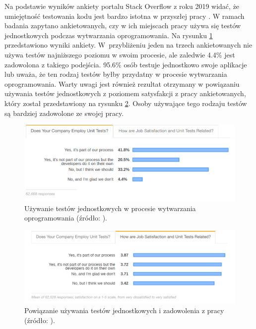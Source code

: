 Na podstawie wyników ankiety portalu Stack Overflow z roku 2019 widać, że umiejętność testowania kodu jest bardzo istotna w przyszłej pracy \cite{stack-overflow-survey}.
W ramach badania zapytano ankietowanych, czy w ich miejscach pracy używa się testów jednostkowych podczas wytwarzania oprogramowania.
Na rysunku \ref{fig:unit-tests-use} przedstawiono wyniki ankiety.
W~przybliżeniu jeden na trzech ankietowanych nie używa testów najniższego poziomu w swoim procesie, ale zaledwie 4.4\% jest zadowolona z takiego podejścia.
95.6\% osób testuje jednostkowo swoje aplikacje lub uważa, że ten rodzaj testów byłby przydatny w procesie wytwarzania oprogramowania.
Warty uwagi jest również rezultat otrzymany w powiązaniu używania testów jednostkowych z poziomem satysfakcji z pracy ankietowanych, który został przedstawiony na rysunku \ref{fig:unit-tests-satisfaction}.
Osoby używające tego rodzaju testów są bardziej zadowolone ze swojej pracy.

\begin{figure}[h]
    \centering
    \includegraphics[width = 13cm]{chapter02/unit-tests-use.png}
    \caption{Używanie testów jednostkowych w procesie wytwarzania oprogramowania (źródło: \cite{stack-overflow-survey}).}
    \label{fig:unit-tests-use}
\end{figure}

\begin{figure}[h]
    \centering
    \includegraphics[width = 13cm]{chapter02/unit-tests-satisfaction.png}
    \caption{Powiązanie używania testów jednostkowych i zadowolenia z pracy (źródło: \cite{stack-overflow-survey}).}
    \label{fig:unit-tests-satisfaction}
\end{figure}

